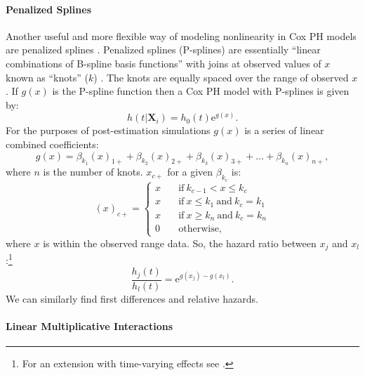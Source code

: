 \documentclass[nojss]{jss}\usepackage{graphicx, color}
\begin{document}
\paragraph{Penalized Splines} Another useful and more flexible way of modeling nonlinearity in Cox PH models are penalized splines \citep[see][]{Gray1992,Keele2008}. Penalized splines (P-splines) are essentially ``linear combinations of B-spline basis functions'' \cite[][5]{Strasak2009} with joins at observed values of $x$ known as ``knots'' ($k$) \cite[50]{Keele2008}. The knots are equally spaced over the range of observed $x$. If $g(x)$ is the P-spline function then a Cox PH model with P-splines is given by:
%
\begin{equation}
	h(t|\mathbf{X}_{i})=h_{0}(t)\mathrm{e}^{g(x)}.
\end{equation}
% 
For the purposes of post-estimation simulations $g(x)$ is a series of linear combined coefficients: 
%
\begin{equation}
    g(x) = \beta_{k_{1}}(x)_{1+} + \beta_{k_{2}}(x)_{2+} + \beta_{k_{3}}(x)_{3+} + \ldots + \beta_{k_{n}}(x)_{n+},
\end{equation}  
%
where $n$ is the number of knots. $x_{c+}$ for a given $\beta_{k_{c}}$ is:
%
\begin{equation}
    (x)_{c+} = 
    \left \{
    \begin{array}{ll}
        x & \quad \text{if} \: k_{c-1} < x \leq k_{c} \\
        x & \quad \text{if} \: x \leq k_{1} \: \text{and} \: k_{c} = k_{1} \\
        x & \quad \text{if} \: x \geq k_{n} \: \text{and} \: k_{c} = k_{n} \\
        0 & \quad \text{otherwise,}
    \end{array}
    \right.
\end{equation}
%
where $x$ is within the observed range data. So, the hazard ratio between $x_{j}$ and $x_{l}$:\footnote{For an extension with time-varying effects see \cite{Strasak2009}.} 
%
\begin{equation}
	\frac{h_{j}(t)}{h_{l}(t)} = \mathrm{e}^{g(x_{j}) - g(x_{l})}.
\end{equation}
%
We can similarly find first differences and relative hazards.


\paragraph{Linear Multiplicative Interactions}
\end{document}
